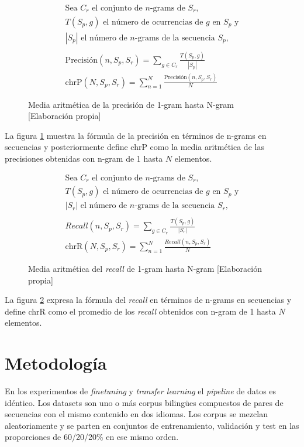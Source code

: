 \begin{figure}[H]
    \begin{align*}
        \text{Sea }C_{r}\text{ el conjunto de }n\text{-grams de }S_{r}\text{,}\\
        T(S_{p}, g)\text{ el número de ocurrencias de }g\text{ en }S_{p}\text{ y}\\
        |S_{p}|\text{ el número de }n\text{-grams de la secuencia }S_{p}\text{,}\\ \\
        \text{Precisión}(n,S_{p},S_{r})=\sum_{g\in{C_{r}}}{\frac{ T(S_{p},g) }{ |S_{p}| }}\\
        \text{chrP}(N,S_{p},S_{r})=\sum_{n=1}^{N}\frac{\text{Precisión}(n,S_{p},S_{r})}{N}
    \end{align*}
    \caption{Media aritmética de la precisión de 1-gram hasta N-gram [Elaboración propia]}\label{chrfprecisionformula}
\end{figure}

La figura \ref{chrfprecisionformula} muestra la fórmula de la precisión en términos de n-grams en secuencias y posteriormente define chrP como la media aritmética de las precisiones obtenidas con n-gram de 1 hasta $N$ elementos.

\begin{figure}[H]
    \begin{align*}
        \text{Sea }C_{r}\text{ el conjunto de }n\text{-grams de }S_{r}\text{,}\\
        T(S_{p}, g)\text{ el número de ocurrencias de }g\text{ en }S_{p}\text{ y}\\
        |S_{r}|\text{ el número de }n\text{-grams de la secuencia }S_{r}\text{,}\\ \\
        \textit{Recall}(n,S_{p},S_{r})=\sum_{g\in{C_{r}}}{\frac{ T(S_{p},g) }{ |S_{r}| }}\\
        \text{chrR}(N,S_{p},S_{r})=\sum_{n=1}^{N}\frac{\textit{Recall}(n,S_{p},S_{r})}{N}
    \end{align*}
    \caption{Media aritmética del \textit{recall} de 1-gram hasta N-gram [Elaboración propia]}\label{chrfrecallformula}
\end{figure}

La figura \ref{chrfrecallformula} expresa la fórmula del \textit{recall} en términos de n-grams en secuencias y define chrR como el promedio de los \textit{recall} obtenidos con n-gram de 1 hasta $N$ elementos.

\section{Metodología}\label{datapipeline}
En los experimentos de \textit{finetuning} y \textit{transfer learning} el \textit{pipeline} de datos es idéntico. Los datasets son uno o más corpus biling{\"u}es compuestos de pares de secuencias con el mismo contenido en dos idiomas. Los corpus se mezclan aleatoriamente y se parten en conjuntos de entrenamiento, validación y test en las proporciones de 60/20/20\% en ese mismo orden.

